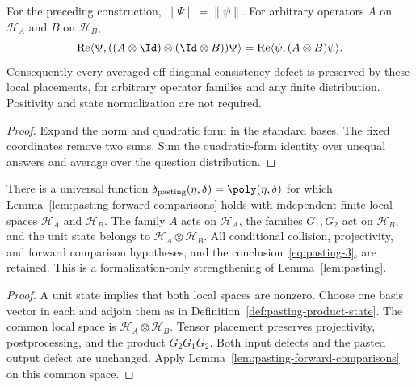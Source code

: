 \begin{lemma}
	\label{lem:pasting-product-state-preservation}
	\leanok
	For the preceding construction, $\|\Psi\|=\|\psi\|$. For arbitrary
	operators $A$ on $\mathcal H_A$ and $B$ on $\mathcal H_B$,
	\[
		\operatorname{Re}\langle\Psi,
		 ((A\otimes\Id)\otimes(\Id\otimes B))\Psi\rangle
		=\operatorname{Re}\langle\psi,(A\otimes B)\psi\rangle.
	\]
	Consequently every averaged off-diagonal consistency defect is preserved
	by these local placements, for arbitrary operator families and any finite
	distribution. Positivity and state normalization are not required.
\end{lemma}
\begin{proof}
	\leanok
	Expand the norm and quadratic form in the standard bases. The fixed
	coordinates remove two sums. Sum the quadratic-form identity over unequal
	answers and average over the question distribution.
\end{proof}

\begin{lemma}
	\label{lem:pasting-heterogeneous}
	\leanok
	There is a universal function
	$\delta_{\mathrm{pasting}}(\eta,\delta)=\poly(\eta,\delta)$ for which
	Lemma~\ref{lem:pasting-forward-comparisons} holds with independent finite
	local spaces $\mathcal H_A$ and $\mathcal H_B$. The family $A$ acts on
	$\mathcal H_A$, the families $G_1,G_2$ act on $\mathcal H_B$, and the
	unit state belongs to $\mathcal H_A\otimes\mathcal H_B$. All conditional
	collision, projectivity, and forward comparison hypotheses, and the
	conclusion~\eqref{eq:pasting-3}, are retained. This is a
	formalization-only strengthening of Lemma~\ref{lem:pasting}.
\end{lemma}
\begin{proof}
	\leanok
	A unit state implies that both local spaces are nonzero. Choose one basis
	vector in each and adjoin them as in Definition~\ref{def:pasting-product-state}.
	The common local space is $\mathcal H_A\otimes\mathcal H_B$.
	Tensor placement preserves projectivity, postprocessing, and the product
	$G_2G_1G_2$. Both input defects and the pasted output defect are unchanged.
	Apply Lemma~\ref{lem:pasting-forward-comparisons} on this common space.
\end{proof}

